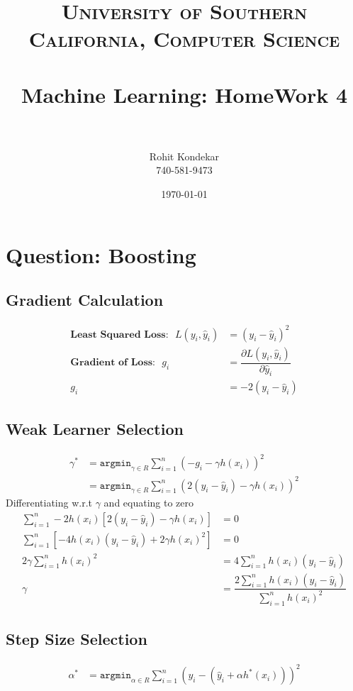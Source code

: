 \documentclass[paper=a4, fontsize=11pt]{scrartcl} %
\title{	
\normalfont \normalsize 
\textsc{University of Southern California, Computer Science} \\ [25pt] %
\horrule{0.5pt} \\[0.4cm] %
\huge Machine Learning: HomeWork 4 \\ %
\horrule{2pt} \\[0.5cm] %
}
\author{Rohit Kondekar\\
740-581-9473} %
\date{\normalsize\today} %
\numberwithin{equation}{section} %
\numberwithin{figure}{section} %
\numberwithin{table}{section} %
\begin{document}
\maketitle %


\section{Question: Boosting}
\subsection{Gradient Calculation}

\begin{align*} 
\textbf{Least Squared Loss:}~~~  L(y_{i},\hat{y}_i) &= (y_{i} - \hat{y}_i)^{2}\\
\textbf{Gradient of Loss:} ~~~ g_{i} &= \dfrac{\partial L(y_{i},\hat{y}_i) }{\partial \hat{y}_i}\\
 g_{i} &= -2(y_{i} - \hat{y}_i)
\end{align*}

\subsection{Weak Learner Selection}
\begin{align*}
\gamma^{*} &= \texttt{argmin}_{\gamma \in R} \sum_{i=1}^{n}(-g_{i}- \gamma h(x_{i}))^{2}\\
&= \texttt{argmin}_{\gamma \in R} \sum_{i=1}^{n}(2(y_{i} - \hat{y}_i)- \gamma h(x_{i}))^{2}
\end{align*}
Differentiating w.r.t $\gamma$ and equating to zero
\begin{align*}
\sum_{i=1}^{n} -2h(x_{i}) [2(y_{i} - \hat{y}_i)- \gamma h(x_{i})] &= 0\\
\sum_{i=1}^{n} [-4h(x_{i})(y_{i} - \hat{y}_i) + 2\gamma h(x_{i})^{2}] &=0\\
2\gamma \sum_{i=1}^{n} h(x_{i})^{2} &= 4\sum_{i=1}^{n} h(x_{i})(y_{i} - \hat{y}_i)\\
\gamma &=  \dfrac{2\sum_{i=1}^{n} h(x_{i})(y_{i} - \hat{y}_i)}{\sum_{i=1}^{n} h(x_{i})^{2}}
\end{align*}

\subsection{Step Size Selection}
\begin{align*}
\alpha^{*} &= \texttt{argmin}_{\alpha \in R}  \sum_{i=1}^{n} (y_{i} - (\hat{y}_{i} + \alpha h^{*}(x_{i})))^{2}
\end{align*}
\end{document}
